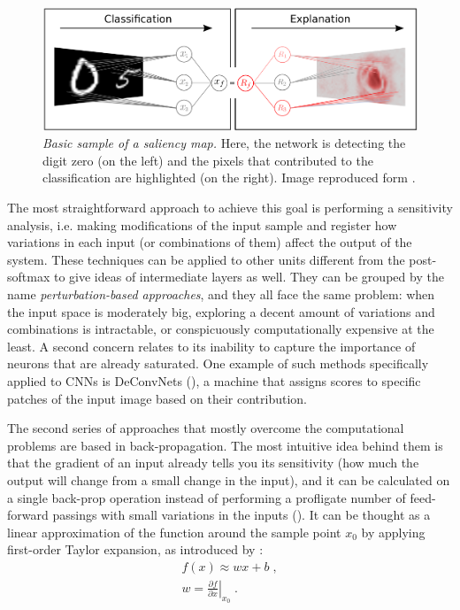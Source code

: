 \begin{figure}
	\centering
	\includegraphics[width=0.7\linewidth]{Figures/deeptaylor}
	\caption{\textit{Basic sample of a saliency map.} Here, the network is detecting the digit zero (on the left) and the pixels that contributed to the classification are highlighted (on the right). Image reproduced form \cite{Montavon2017}.}
	\label{fig:deeptaylor}
\end{figure}


The most straightforward approach to achieve this goal is performing a sensitivity analysis, i.e. making modifications of the input sample and register how variations in each input (or combinations of them) affect the output of the system. These techniques can be applied to other units different from the post-softmax to give ideas of intermediate layers as well. They can be grouped by the name \textit{perturbation-based approaches}, and they all face the same problem: when the input space is moderately big, exploring a decent amount of variations and combinations is intractable, or conspicuously computationally expensive at the least. A second concern relates to its inability to capture the importance of neurons that are already saturated. One example of such methods specifically applied to CNNs is DeConvNets (\cite{Zeiler2014}), a machine that assigns scores to specific patches of the input image based on their contribution.

The second series of approaches that mostly overcome the computational problems are based in back-propagation. The most intuitive idea behind them is that the gradient of an input already tells you its sensitivity (how much the output will change from a small change in the input), and it can be calculated on a single back-prop operation instead of performing a profligate number of feed-forward passings with small variations in the inputs (\cite{Shrikumar2017}). It can be thought as a linear approximation of the function around the sample point $x_0$ by applying first-order Taylor expansion, as introduced by \cite{Simonyan2014}:
\begin{align}
f(x) \approx w x + b \; , \nonumber \\
w = \left. \frac{\partial f}{\partial x} \right|_{x_0} \; .
\end{align}

